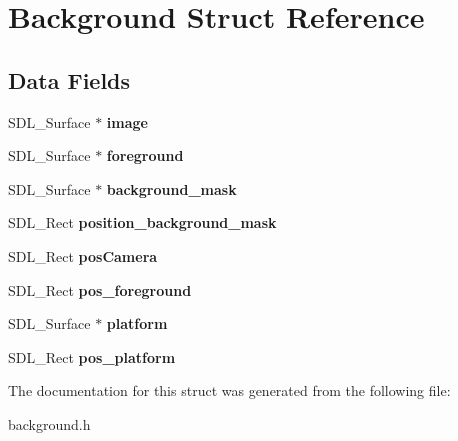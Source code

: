 \hypertarget{structBackground}{}\section{Background Struct Reference}
\label{structBackground}
\subsection*{Data Fields}
\begin{DoxyCompactItemize}
\item 
\mbox{\label{structBackground_a637e6c83f05e045ce23bda645cdd8574}} 
S\+D\+L\+\_\+\+Surface $\ast$ {\bfseries image}
\item 
\mbox{\label{structBackground_a3d66779716725a2f8377aaed0eb374b2}} 
S\+D\+L\+\_\+\+Surface $\ast$ {\bfseries foreground}
\item 
\mbox{\label{structBackground_ac76c2da4307e469688a1286d4ac70842}} 
S\+D\+L\+\_\+\+Surface $\ast$ {\bfseries background\+\_\+mask}
\item 
\mbox{\label{structBackground_a6a43437543c71a78285c8049b5cb3dc0}} 
S\+D\+L\+\_\+\+Rect {\bfseries position\+\_\+background\+\_\+mask}
\item 
\mbox{\label{structBackground_a41d570eb769454b0488aeccd9e4970a2}} 
S\+D\+L\+\_\+\+Rect {\bfseries pos\+Camera}
\item 
\mbox{\label{structBackground_afa1e935c412a4c4154f5c3e2b7b93791}} 
S\+D\+L\+\_\+\+Rect {\bfseries pos\+\_\+foreground}
\item 
\mbox{\label{structBackground_a57b869b301c9c1e8f69c9abee7e00b2a}} 
S\+D\+L\+\_\+\+Surface $\ast$ {\bfseries platform}
\item 
\mbox{\label{structBackground_af35046bf47fc0b707d62020227b58720}} 
S\+D\+L\+\_\+\+Rect {\bfseries pos\+\_\+platform}
\end{DoxyCompactItemize}


The documentation for this struct was generated from the following file\+:\begin{DoxyCompactItemize}
\item 
background.\+h\end{DoxyCompactItemize}
